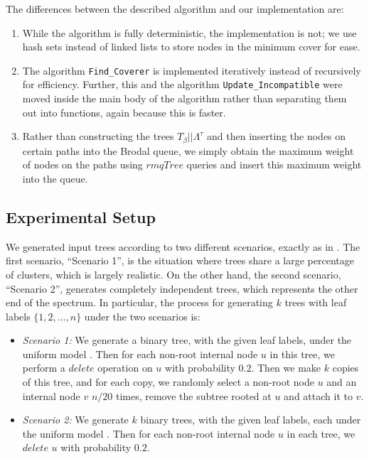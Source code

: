 \documentclass[12pt,a4paper]{article}
\newcommand{\leafset}{\Lambda}
\newcommand{\TB}{T_\beta}
\begin{document}
    The differences between the described algorithm and our implementation are:

    \begin{enumerate}
        \item While the algorithm is fully deterministic, the implementation is not; we use hash sets instead of linked lists to store nodes in the minimum cover for ease.

        \item The algorithm \texttt{Find\_Coverer} is implemented iteratively instead of recursively for efficiency. Further, this and the algorithm \texttt{Update\_Incompatible} were moved inside the main body of the algorithm rather than separating them out into functions, again because this is faster.

        \item Rather than constructing the trees $\TB||\leafset^{\tau}$ and then inserting the nodes on certain paths into the Brodal queue, we simply obtain the maximum weight of nodes on the paths using $rmqTree$ queries and insert this maximum weight into the queue.
    \end{enumerate}

    \subsection{Experimental Setup}
    \label{subsec:setup}

    We generated input trees according to two different scenarios, exactly as in \cite{jansson2018algorithms}. The first scenario, ``Scenario 1'', is the situation where trees share a large percentage of clusters, which is largely realistic. On the other hand, the second scenario, ``Scenario 2'', generates completely independent trees, which represents the other end of the spectrum. In particular, the process for generating $k$ trees with leaf labels $\{1, 2, \dots, n\}$ under the two scenarios is:

    \begin{itemize}
        \item \textit{Scenario 1:} We generate a binary tree, with the given leaf labels, under the uniform model \citep{mckenzie2000distributions}. Then for each non-root internal node $u$ in this tree, we perform a $delete$ operation on $u$ with probability $0.2$. Then we make $k$ copies of this tree, and for each copy, we randomly select a non-root node $u$ and an internal node $v$ $n / 20$ times, remove the subtree rooted at $u$ and attach it to $v$.

        \item \textit {Scenario 2:} We generate $k$ binary trees, with the given leaf labels, each under the uniform model \citep{mckenzie2000distributions}. Then for each non-root internal node $u$ in each tree, we $delete$ $u$ with probability $0.2$.
    \end{itemize}
\end{document}
